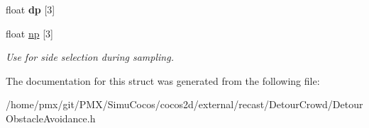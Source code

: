 \begin{DoxyCompactItemize}
\mbox{\label{structdtObstacleCircle_a1fa9a4828586508e9e7830fb9b0e46f7}} 
float {\bfseries dp} \mbox{[}3\mbox{]}
\item 
\mbox{\label{structdtObstacleCircle_adc0ed3d2deecdda4a11fc54c421a1bf4}} 
float \hyperlink{structdtObstacleCircle_adc0ed3d2deecdda4a11fc54c421a1bf4}{np} \mbox{[}3\mbox{]}
\begin{DoxyCompactList}\small\item\em Use for side selection during sampling. \end{DoxyCompactList}\end{DoxyCompactItemize}


The documentation for this struct was generated from the following file\+:\begin{DoxyCompactItemize}
\item 
/home/pmx/git/\+P\+M\+X/\+Simu\+Cocos/cocos2d/external/recast/\+Detour\+Crowd/Detour\+Obstacle\+Avoidance.\+h\end{DoxyCompactItemize}
